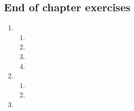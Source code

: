 \subsection{End of chapter exercises} %

\begin{enumerate}[itemsep=6pt, label=\textbf{\arabic*}. ] 
\item %

    \begin{enumerate}[noitemsep, label=\textbf{(\alph*)} ]
  \item %
\item %
\item %
\item %
 \end{enumerate}
\item %

    \begin{enumerate}[noitemsep, label=\textbf{(\alph*)} ]
 \item %
\item %

\end{enumerate}

\item %
\end{enumerate}

